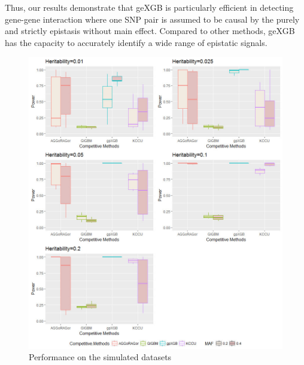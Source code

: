 \documentclass[11pt]{article}
\theoremstyle{plain}
\theoremstyle{definition}
\theoremstyle{remark}
\begin{document}
\noindent Thus, our results demonstrate that geXGB is particularly efficient in detecting gene-gene interaction where one SNP pair is assumed to be causal by the purely and strictly epistasis without main effect. Compared to other methods, geXGB has the capacity to accurately identify a wide range of epistatic signals.

\begin{figure}[H]
    \begin{center}
       \includegraphics[scale=0.6]{boxplot_10simu.jpg}
    \end{center}
\caption{\label{det}Performance on the simulated datasets}
\end{figure}
\end{document}
